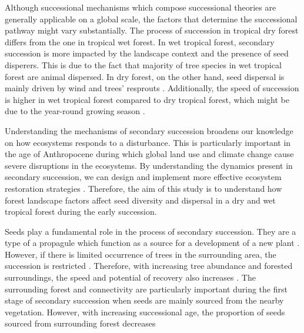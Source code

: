 Although successional mechanisms which compose successional theories are generally applicable on a global scale, the factors that determine the successional pathway might vary substantially. The process of succession in tropical dry forest differs from the one in tropical wet forest. In wet tropical forest, secondary succession is more impacted by the landscape context and the presence of seed disperers. This is due to the fact that majority of tree species in wet tropical forest are animal dispersed. In dry forest, on the other hand, seed dispersal is mainly driven by wind and trees' resprouts \citep{hordijkLandUseHistory2024, lohbeckSuccessionalChangesFunctional2013}. Additionally, the speed of succession is higher in wet tropical forest compared to dry tropical forest, which might be due to the year-round growing season \citep{hordijk2023efectos}.



Understanding the mechanisms of secondary succession broadens our knowledge on how ecosystems responds to a disturbance. This is particularly important in the age of Anthropocene during which global land use and climate change cause severe disruptions in the ecosystems. By understanding the dynamics present in secondary succession, we can design and implement more effective ecosystem restoration strategies \cite{poorterSuccessionalTheories2023}. Therefore, the aim of this study is to understand how forest landscape factors affect seed diversity and dispersal in a dry and wet tropical forest during the early succession. 

Seeds play a fundamental role in the process of secondary succession. They are a type of a propagule which function as a source for a development of a new plant \citep{poorterSuccessionalTheories2023}. However, if there is limited occurrence of trees in the surrounding area, the succession is restricted \citep{hordijk2023efectos}. Therefore, with increasing tree abundance and forested surroundings, the speed and potential of recovery also increases \citet{arroyo-rodriguezMultipleSuccessionalPathways2017}. The surrounding forest and connectivity are particularly important during the first stage of secondary succession when seeds are mainly sourced from the nearby vegetation. However, with increasing successional age, the proportion of seeds sourced from surrounding forest decreases 

